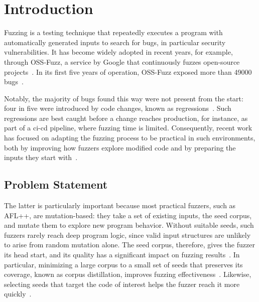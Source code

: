 
\chapter{Introduction}\label{chapter:introduction}

Fuzzing is a testing technique that repeatedly executes a program with automatically generated inputs to search for bugs, in particular security vulnerabilities.
It has become widely adopted in recent years, for example, through OSS-Fuzz, a service by Google that continuously fuzzes open-source projects~\cite{serebryanyOSSFuzzGooglesContinuous2017}.
In its first five years of operation, OSS-Fuzz exposed more than \num{49000} bugs~\cite{kimBugOssBenchmarkRealworld2024}.

Notably, the majority of bugs found this way were not present from the start: four in five were introduced by code changes, known as regressions~\cite{zhuRegressionGreyboxFuzzing2021b}.
Such regressions are best caught before a change reaches production, for instance, as part of a \ac{ci-cd} pipeline, where fuzzing time is limited.
Consequently, recent work has focused on adapting the fuzzing process to be practical in such environments, both by improving how fuzzers explore modified code and by preparing the inputs they start with~\cite{j.wolffShiftingFuzzingLeft2025, LargeScaleEmpiricalAnalysis}.

\section{Problem Statement}
The latter is particularly important because most practical fuzzers, such as AFL++\cite{fioraldiAFLCombiningIncremental2020}, are mutation-based: they take a set of existing inputs, the seed corpus, and mutate them to explore new program behavior.
Without suitable seeds, such fuzzers rarely reach deep program logic, since valid input structures are unlikely to arise from random mutation alone.
The seed corpus, therefore, gives the fuzzer its head start, and its quality has a significant impact on fuzzing results~\cite{klees2018}.
In particular, minimizing a large corpus to a small set of seeds that preserves its coverage, known as corpus distillation, improves fuzzing effectiveness~\cite{herreraCorpusDistillationEffective2020, herreraSeedSelectionSuccessful2021}.
Likewise, selecting seeds that target the code of interest helps the fuzzer reach it more quickly~\cite {yooImprovingConfigurabilityUnitlevel2021, kimBugOssBenchmarkRealworld2024, canakciTargetFuzzUsingDARTs2022}.

